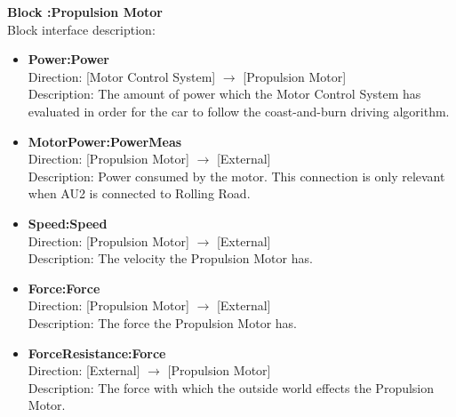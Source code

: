 \textbf{Block :Propulsion Motor}\\
Block interface description:
\begin{itemize}
	\item \textbf{Power:Power}\\
	Direction: [Motor Control System] $\rightarrow$ [Propulsion Motor]\\
	Description: The amount of power which the Motor Control System has evaluated in order for the car to follow the coast-and-burn driving algorithm.
	\item \textbf{MotorPower:PowerMeas}\\
	Direction: [Propulsion Motor] $\rightarrow$ [External]\\
	Description: Power consumed by the motor. This connection is only relevant when AU2 is connected to Rolling Road.
	\item \textbf{Speed:Speed}\\
	Direction: [Propulsion Motor] $\rightarrow$ [External]\\
	Description: The velocity the Propulsion Motor has.
	\item \textbf{Force:Force}\\
	Direction: [Propulsion Motor] $\rightarrow$ [External]\\
	Description: The force the Propulsion Motor has.
	\item \textbf{ForceResistance:Force}\\
	Direction: [External] $\rightarrow$ [Propulsion Motor]\\
	Description: The force with which the outside world effects the Propulsion Motor.
\end{itemize}

